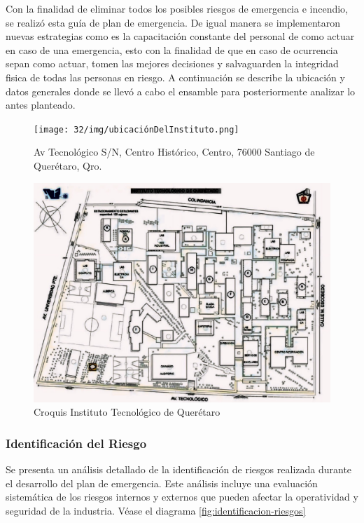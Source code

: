     Con la finalidad de eliminar todos los posibles riesgos de emergencia e incendio, se realizó esta guía de plan de emergencia. De igual manera se implementaron nuevas estrategias como es la capacitación constante del personal de como actuar en caso de una emergencia, esto con la finalidad de que en caso de ocurrencia sepan como actuar, tomen las mejores decisiones y salvaguarden la integridad fisica de todas las personas en riesgo. 
    A continuación se describe la ubicación y datos generales donde se llevó a cabo el ensamble para posteriormente analizar lo antes planteado.
    \begin{figure}[H]
        \centering
        \texttt{[image: 32/img/ubicaciónDelInstituto.png]}
        \caption{Av Tecnológico S/N, Centro Histórico, Centro, 76000 Santiago de Querétaro, Qro.}
        \label{fig:enter-label}
    \end{figure}
    \begin{figure}[H]
        \centering
        \includegraphics[scale=0.2]{32/img/croquisITQ.jpg}
        \caption{Croquis Instituto Tecnológico de Querétaro}
        \label{fig:enter-label}
    \end{figure}
    \subsubsection{Identificación del Riesgo}
    Se presenta un análisis detallado de la identificación de riesgos realizada durante el desarrollo del plan de emergencia. Este análisis incluye una evaluación sistemática de los riesgos internos y externos que pueden afectar la operatividad y seguridad de la industria. Véase el diagrama  \ref{fig:identificacion-riesgos}

